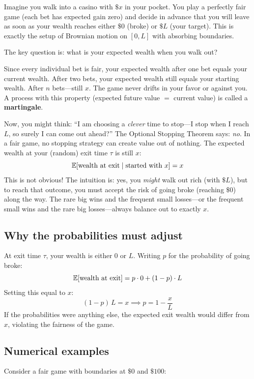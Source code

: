 \begin{notechapter}
Imagine you walk into a casino with $\$x$ in your pocket. You play a
perfectly fair game (each bet has expected gain zero) and decide in advance
that you will leave as soon as your wealth reaches either $\$0$ (broke) or
$\$L$ (your target). This is exactly the setup of Brownian motion on
$[0, L]$ with absorbing boundaries.

The key question is: what is your expected wealth when you walk out?

Since every individual bet is fair, your expected wealth after one bet equals
your current wealth. After two bets, your expected wealth still equals your
starting wealth. After $n$ bets---still $x$. The game never drifts in your
favor or against you. A process with this property (expected future value
$=$ current value) is called a \textbf{martingale}.

Now, you might think: ``I am choosing a \emph{clever} time to stop---I stop
when I reach $L$, so surely I can come out ahead?'' The Optional Stopping
Theorem says: \emph{no}. In a fair game, no stopping strategy can create
value out of nothing. The expected wealth at your (random) exit time $\tau$
is still $x$:
\[
\mathbb{E}[\text{wealth at exit} \mid \text{started with } x] = x
\]
This is not obvious! The intuition is: yes, you \emph{might} walk out rich
(with $\$L$), but to reach that outcome, you must accept the risk of going
broke (reaching $\$0$) along the way. The rare big wins and the frequent
small losses---or the frequent small wins and the rare big losses---always
balance out to exactly $x$.

\subsection*{Why the probabilities must adjust}

At exit time $\tau$, your wealth is either $0$ or $L$. Writing $p$ for the
probability of going broke:
\[
\mathbb{E}[\text{wealth at exit}] = p \cdot 0 + (1-p) \cdot L
\]
Setting this equal to $x$:
\[
(1-p)\,L = x \implies p = 1 - \frac{x}{L}
\]
If the probabilities were anything else, the expected exit wealth would
differ from $x$, violating the fairness of the game.

\subsection*{Numerical examples}

Consider a fair game with boundaries at $\$0$ and $\$100$:


\end{notechapter}
